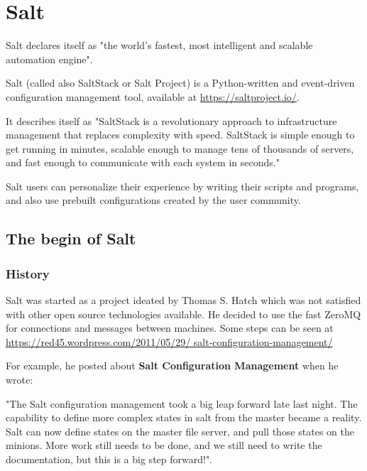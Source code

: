 \documentclass[12pt,a4paper,openright,twoside]{book}
\begin{document}




\chapter{Salt}
Salt declares itself as "the world's fastest, most intelligent and scalable automation engine"\cite{saltDocAbout}.


Salt (called also SaltStack or Salt Project) is a Python-written and event-driven configuration management tool, available at \url{https://saltproject.io/}.


It describes itself as "SaltStack is a revolutionary approach to infrastructure management that replaces complexity with speed. SaltStack is simple enough to get running in minutes, scalable enough to manage tens of thousands of servers, and fast enough to communicate with each system in seconds."\cite{saltDocStart}


Salt users can personalize their experience by writing their scripts and programs, and also use prebuilt configurations created by the user community.

\section{The begin of Salt}

\subsection{History}
Salt was started as a project ideated by Thomas S. Hatch which was not satisfied with other open source technologies available\cite{saltFloss}. He decided to use the fast ZeroMQ for connections and messages between machines. Some steps can be seen at \url{https://red45.wordpress.com/2011/05/29/
salt-configuration-management/}


For example, he posted about \textbf{Salt Configuration Management} when he wrote:


"The Salt configuration management took a big leap forward late last night. The capability to define more complex states in salt from the master became a reality. Salt can now define states on the master file server, and pull those states on the minions. More work still needs to be done, and we still need to write the documentation, but this is a big step forward!".
\end{document}
